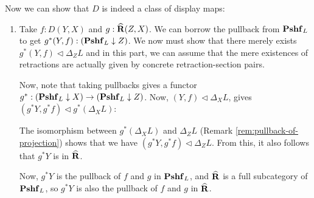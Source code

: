 Now we can show that $ D $ is indeed a class of display maps:
\begin{enumerate}
  \item Take $ f : D(Y, X) $ and $ g: \widehat {\mathbf{R}}(Z, X) $. We can borrow the pullback from $ \mathbf{Pshf}_{L} $ to get $ g^*(Y, f) : (\mathbf{Pshf}_{L} \downarrow Z) $. We now must show that there merely exists $ g^* (Y, f) \triangleleft \Delta_Z L $ and in this part, we can assume that the mere existences of retractions are actually given by concrete retraction-section pairs.

    Now, note that taking pullbacks gives a functor $ g^* : (\mathbf{Pshf}_{L} \downarrow X) \to (\mathbf{Pshf}_{L} \downarrow Z) $. Now, $ (Y, f) \triangleleft \Delta_X L $, gives $ (g^*Y, g^*f) \triangleleft g^*(\Delta_X L) $:
    \begin{center}
    \end{center}
    The isomorphism between $ g^*(\Delta_X L) $ and $ \Delta_Z L $ (Remark \ref{rem:pullback-of-projection}) shows that we have $ (g^*Y, g^*f) \triangleleft \Delta_Z L $. From this, it also follows that $ g^* Y $ is in $ \widehat {\mathbf{R}} $.

    Now, $ g^*Y $ is the pullback of $ f $ and $ g $ in $ \mathbf{Pshf}_{L} $, and $ \widehat {\mathbf{R}} $ is a full subcategory of $ \mathbf{Pshf}_{L} $, so $ g^* Y $ is also the pullback of $ f $ and $ g $ in $ \widehat {\mathbf{R}} $.


\end{enumerate}
